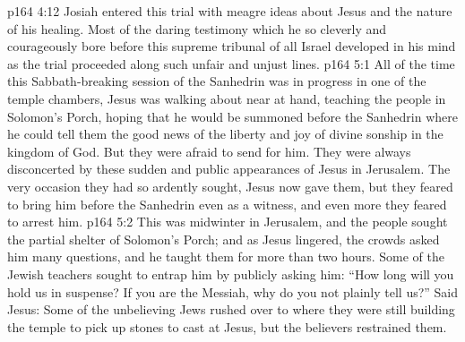 \vs p164 4:12 Josiah entered this trial with meagre ideas about Jesus and the nature of his healing. Most of the daring testimony which he so cleverly and courageously bore before this supreme tribunal of all Israel developed in his mind as the trial proceeded along such unfair and unjust lines.
\vs p164 5:1 All of the time this Sabbath\hyp{}breaking session of the Sanhedrin was in progress in one of the temple chambers, Jesus was walking about near at hand, teaching the people in Solomon’s Porch, hoping that he would be summoned before the Sanhedrin where he could tell them the good news of the liberty and joy of divine sonship in the kingdom of God. But they were afraid to send for him. They were always disconcerted by these sudden and public appearances of Jesus in Jerusalem. The very occasion they had so ardently sought, Jesus now gave them, but they feared to bring him before the Sanhedrin even as a witness, and even more they feared to arrest him.
\vs p164 5:2 This was midwinter in Jerusalem, and the people sought the partial shelter of Solomon’s Porch; and as Jesus lingered, the crowds asked him many questions, and he taught them for more than two hours. Some of the Jewish teachers sought to entrap him by publicly asking him: “How long will you hold us in suspense? If you are the Messiah, why do you not plainly tell us?” Said Jesus:  Some of the unbelieving Jews rushed over to where they were still building the temple to pick up stones to cast at Jesus, but the believers restrained them.

